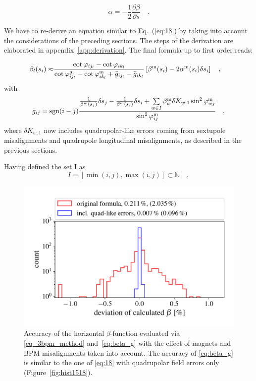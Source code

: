\begin{equation}
\alpha = -\frac{1}{2}\frac{\partial \beta}{ \partial s}\quad .
\end{equation}

We have to re-derive an equation similar to Eq.~(\ref{eq:18}) by taking into account the considerations
of the preceding sections. The steps of the derivation are elaborated in appendix~\ref{app:derivation}.
The final formula up to first order reads:

\begin{align}
\beta_l(s_i) \approx& \frac{\cot\varphi_{i{j_l}} - \cot\varphi_{i{k_l}}}{\cot\varphi_{i{j_l}}^\text{m} - \cot\varphi_{i{k_l}}^\text{m} +\bar{g}_{i{j_l}} - \bar{g}_{i{k_l}}} \left[\beta^\text{m}(s_i) - 2 \alpha^\text{m}(s_i) \delta s_i\right] \quad ,
\label{eq:beta_g}
\end{align}
with 
\begin{equation}
\bar{g}_{ij} = \text{sgn}(i-j)\dfrac{ \frac{1}{\beta^\text{m}(s_j)}\delta s_j - \frac{1}{\beta^\text{m}(s_i)}\delta s_i +
\sum\limits_{w \in I}\beta_w^\text{m}\delta K_{w,1}\sin^2\varphi_{wj}^\text{m}}{\sin^2\varphi_{ij}^\text{m}}\quad ,
\label{eq:g_ij}
\end{equation} 
where $\delta K_{w,1} $ now includes quadrupolar-like errors coming from sextupole misalignments and
quadrupole longitudinal misalignments, as described in the previous sections. 

Having defined the set I as
 \begin{equation}
 I = \left[\min(i,j), \max(i,j)\right] \subset \mathbb{N}\quad ,
 \end{equation}

\begin{figure}
	\centering
  \includegraphics[width=.7\linewidth]{hist1518_EVERYTHING_01}
    \caption{Accuracy of the horizontal $\beta$-function evaluated via \eqref{eq_3bpm_method} and~\eqref{eq:beta_g} with the effect of magnets and BPM misalignments taken into account. The accuracy of
 \eqref{eq:beta_g} is similar to the one of \eqref{eq:18} with quadrupolar field errors only (Figure~\ref{fig:hist1518}).}
	\label{fig:hist1518_with_everything}
\end{figure}

